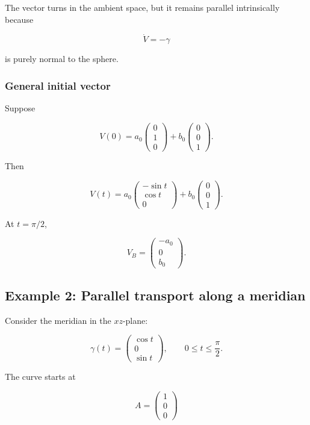 \documentclass[12pt,a4paper]{article}
\theoremstyle{notespace}
\begin{document}
The vector turns in the ambient space, but it remains parallel
intrinsically because

\[
\dot V=-\gamma
\]

is purely normal to the sphere.

\subsubsection{General initial vector}

Suppose

\[
V(0)
=
a_0
\begin{pmatrix}
	0\\
	1\\
	0
\end{pmatrix}
+
b_0
\begin{pmatrix}
	0\\
	0\\
	1
\end{pmatrix}.
\]

Then

\[
V(t)
=
a_0
\begin{pmatrix}
	-\sin t\\
	\cos t\\
	0
\end{pmatrix}
+
b_0
\begin{pmatrix}
	0\\
	0\\
	1
\end{pmatrix}.
\]

At \(t=\pi/2\),

\[
\boxed{
	V_B
	=
	\begin{pmatrix}
		-a_0\\
		0\\
		b_0
	\end{pmatrix}.
}
\]

\subsection{Example 2: Parallel transport along a meridian}

Consider the meridian in the \(xz\)-plane:

\[
\gamma(t)
=
\begin{pmatrix}
	\cos t\\
	0\\
	\sin t
\end{pmatrix},
\qquad
0\leq t\leq\frac{\pi}{2}.
\]

The curve starts at

\[
A=
\begin{pmatrix}
	1\\
	0\\
	0
\end{pmatrix}
\]
\end{document}
